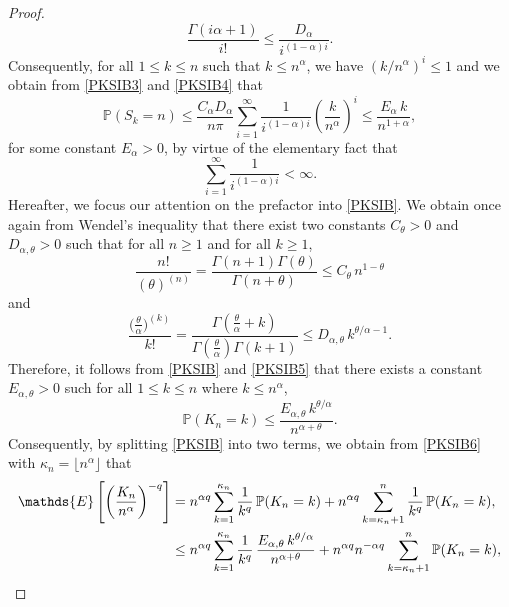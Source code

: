 \documentclass[twoside,12pt]{article}
\newcommand{\dP}{\mathbb{P}}
\newcommand{\E}{\mathds{E}}
\begin{document}
\begin{proof}
\begin{equation}
\label{PKSIB4}
\frac{\Gamma(i\alpha +1)}{i!}\le \frac{D_\alpha}{i^{(1-\alpha)i}}.
\end{equation}
Consequently, for all $1 \leq k \leq n$ such that $k\le n^\alpha$, we have $(k/n^\alpha)^i\le 1$ and we obtain from \eqref{PKSIB3} and \eqref{PKSIB4}
that 
\begin{equation}
\label{PKSIB5}
\dP(S_k=n)\le \frac{C_\alpha D_\alpha}{n \pi}\sum_{i=1}^\infty \frac{1}{{i^{(1-\alpha)i}}}\left(\frac{k}{n^\alpha}\right)^i\le 
 \frac{E_\alpha\,k}{n^{1+\alpha}},
\end{equation}
for some constant $E_\alpha>0$, by virtue of the elementary fact that
$$
\sum_{i=1}^\infty \frac{1}{{i^{(1-\alpha)i}}}< \infty.
$$
Hereafter, we focus our attention on the prefactor into \eqref{PKSIB}.
We obtain once again from Wendel’s inequality that there exist two constants $C_\theta >0$ and $D_{\alpha, \theta} >0$ such that
for all $n \geq 1$ and for all $k \geq 1$,
\begin{displaymath}
\frac{n!}{(\theta)^{(n)}}=\frac{\Gamma(n+1)\Gamma(\theta)}{\Gamma(n+\theta)}
\le C_\theta\,n^{1-\theta}
\end{displaymath}
and
\begin{displaymath}
\frac{\big(\frac{\theta}{\alpha}\big)^{(k)}}{k!}
=\frac{\Gamma(\frac{\theta}{\alpha}+k)}{\Gamma(\frac{\theta}{\alpha})\Gamma(k+1)}
\le D_{\alpha, \theta}\,k^{\theta/\alpha-1}.
\end{displaymath}
Therefore, it follows from \eqref{PKSIB} and \eqref{PKSIB5} that there exists a constant $E_{\alpha, \theta} >0$ such
for all $1\leq k \leq n$ where $k\le n^\alpha$,
\begin{equation}
\label{PKSIB6}
\dP(K_n=k)\le \frac{E_{\alpha, \theta}\,   k^{\theta/\alpha}}{n^{\alpha+\theta}}.
\end{equation}
Consequently, by splitting \eqref{PKSIB} into two terms, we obtain from \eqref{PKSIB6} with $\kappa_n=\lfloor n^\alpha\rfloor$ that
\begin{align}
\E\left[\left(\frac{K_n}{n^\alpha}\right)^{-q}\right]
&= n^{\alpha q} \sum_{k=1}^{\kappa_n} \frac{1}{k^{q}}\, \dP(K_n=k)
+ n^{\alpha q} \sum_{k=\kappa_n +1}^{n} \frac{1}{k^{q}}\, \dP(K_n=k), \notag \\
& \leq n^{\alpha q} \sum_{k=1}^{\kappa_n} \frac{1}{k^{q}}\, \frac{E_{\alpha, \theta}\,   k^{\theta/\alpha}}{n^{\alpha+\theta}}
+ n^{\alpha q}n^{-\alpha q} \sum_{k=\kappa_n +1}^{n}  \dP(K_n=k),
 \notag \\

\end{align}
\end{proof}
\end{document}
